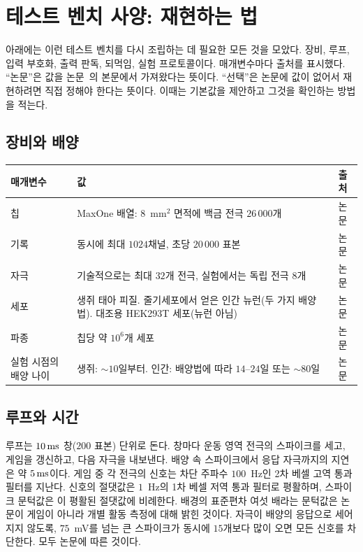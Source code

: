 \section{테스트 벤치 사양: 재현하는 법}
\label{sec:dishspec}

아래에는 이런 테스트 벤치를 다시 조립하는 데 필요한 모든 것을 모았다. 장비, 루프, 입력 부호화, 출력 판독, 되먹임, 실험 프로토콜이다. 매개변수마다 출처를 표시했다. “논문”은 값을 논문~\cite{Kagan2022}의 본문에서 가져왔다는 뜻이다. “선택”은 논문에 값이 없어서 재현하려면 직접 정해야 한다는 뜻이다. 이때는 기본값을 제안하고 그것을 확인하는 방법을 적는다.

\subsection*{장비와 배양}

\begin{center}
\footnotesize
\setlength{\tabcolsep}{4pt}
\renewcommand{\arraystretch}{1.15}
\begin{tabular}{>{\raggedright}p{4.0cm}>{\raggedright}p{6.9cm}>{\raggedright\arraybackslash}p{1.6cm}}
\toprule
매개변수 & 값 & 출처 \\
\midrule
칩 & MaxOne 배열: $8$~mm$^2$ 면적에 백금 전극 $26\,000$개 & 논문 \\
기록 & 동시에 최대 $1024$채널, 초당 $20\,000$ 표본 & 논문 \\
자극 & 기술적으로는 최대 $32$개 전극, 실험에서는 독립 전극 $8$개 & 논문 \\
세포 & 생쥐 태아 피질. 줄기세포에서 얻은 인간 뉴런(두 가지 배양법). 대조용 HEK293T 세포(뉴런 아님) & 논문 \\
파종 & 칩당 약 $10^6$개 세포 & 논문 \\
실험 시점의 배양 나이 & 생쥐: $\sim10$일부터. 인간: 배양법에 따라 $14$--$24$일 또는 $\sim80$일 & 논문 \\
\bottomrule
\end{tabular}
\end{center}

\subsection*{루프와 시간}

루프는 $10\,\text{ms}$ 창($200$ 표본) 단위로 돈다. 창마다 운동 영역 전극의 스파이크를 세고, 게임을 갱신하고, 다음 자극을 내보낸다. 배양 속 스파이크에서 응답 자극까지의 지연은 약 $5\,\text{ms}$이다. 게임 중 각 전극의 신호는 차단 주파수 $100$~Hz인 2차 베셀 고역 통과 필터를 지난다. 신호의 절댓값은 $1$~Hz의 1차 베셀 저역 통과 필터로 평활하며, 스파이크 문턱값은 이 평활된 절댓값에 비례한다. 배경의 표준편차 여섯 배라는 문턱값은 논문이 게임이 아니라 개별 활동 측정에 대해 밝힌 것이다. 자극이 배양의 응답으로 세어지지 않도록, $75$~mV를 넘는 큰 스파이크가 동시에 $15$개보다 많이 오면 모든 신호를 차단한다. 모두 논문에 따른 것이다.

